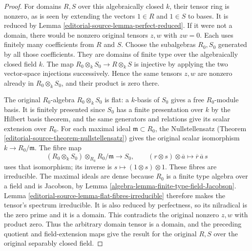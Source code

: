 \begin{proof}
For domains $R,S$ over this
algebraically closed $k$, their
tensor ring is nonzero, as is
seen by extending the vectors
$1\in R$ and $1\in S$ to bases.
It is reduced by Lemma
\ref{editorial-source-lemma-perfect-reduced}.
If it were not a domain, there
would be nonzero original tensors
$z,w$ with $zw=0$. Each uses
finitely many coefficients from
$R$ and $S$. Choose the subalgebras
$R_0,S_0$ generated by all those
coefficients. They are domains
of finite type over the
algebraically closed field $k$.
The map $R_0\otimes_k S_0\to R\otimes_k S$
is injective by applying the
two vector-space injections
successively. Hence the same
tensors $z,w$ are nonzero already
in $R_0\otimes_k S_0$, and
their product is zero there.

The original $R_0$-algebra
$R_0\otimes_k S_0$ is flat:
a $k$-basis of $S_0$ gives a
free $R_0$-module basis.
It is finitely presented since
$S_0$ has a finite presentation
over $k$ by the Hilbert basis
theorem, and the same generators
and relations give its scalar
extension over $R_0$.
For each maximal ideal
$\mathfrak m\subset R_0$, the
Nullstellensatz (Theorem \ref{editorial-source-theorem-nullstellensatz}) gives the
original scalar isomorphism
$k\to R_0/\mathfrak m$.
The fibre map
$$
(R_0\otimes_k S_0)\otimes_{R_0}R_0/\mathfrak m
\longrightarrow S_0,
\qquad(r\otimes s)\otimes\overline a
\longmapsto\overline r\,\overline a\,s
$$
uses that isomorphism; its
inverse is $s\mapsto(1\otimes s)\otimes1$.
These fibres are irreducible.
The maximal ideals are dense
because $R_0$ is a finite type
algebra over a field and is
Jacobson, by Lemma
\ref{algebra-lemma-finite-type-field-Jacobson}.
Lemma \ref{editorial-source-lemma-flat-fibres-irreducible}
therefore makes the tensor's
spectrum irreducible. It is
also reduced by perfectness,
so its nilradical is the zero
prime and it is a domain.
This contradicts the original
nonzero $z,w$ with product zero.
Thus the arbitrary domain tensor
is a domain, and the preceding
quotient and field-extension
maps give the result for the
original $R,S$ over the original
separably closed field.
\end{proof}